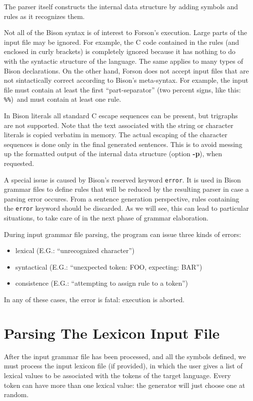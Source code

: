 \documentclass[a4paper,12pt]{article}
\begin{document}
The parser itself constructs the internal data structure by adding symbols and rules as it recognizes them.

Not all of the Bison syntax is of interest to Forson's execution. Large parts of the input file may be ignored. For example, the C code contained in the rules (and enclosed in curly brackets) is completely ignored because it has nothing to do with the syntactic structure of the language. The same applies to many types of Bison declarations. On the other hand, Forson does not accept input files that are not sintactically correct according to Bison's meta-syntax. For example, the input file must contain at least the first ``part-separator'' (two percent signs, like this: \verb/%%/)\ and must contain at least one rule.

In Bison literals all standard C escape sequences can be present, but trigraphs are not supported. Note that the text associated with the string or character literals is copied verbatim in memory. The actual escaping of the character sequences is done only in the final generated sentences. This is to avoid messing up the formatted output of the internal data structure (option \textbf{-p}), when requested.

A special issue is caused by Bison's reserved keyword \verb/error/. It is used in Bison grammar files to define rules that will be reduced by the resulting parser in case a parsing error occures. From a sentence generation perspective, rules containing the \verb/error/ keyword should be discarded. As we will see, this can lead to particular situations, to take care of in the next phase of grammar elaboration.

During input grammar file parsing, the program can issue three kinds of errors:
\begin{itemize}
\item
lexical (E.G.: ``unrecognized character'')
\item
syntactical (E.G.: ``unexpected token: FOO, expecting: BAR'')
\item
consistence (E.G.: ``attempting to assign rule to a token'')
\end{itemize}

\noindent
In any of these cases, the error is fatal: execution is aborted.



\section{Parsing The Lexicon Input File}
After the input grammar file has been processed, and all the symbols defined, we must process the input lexicon file (if provided), in which the user gives a list of lexical values to be associated with the tokens of the target language. Every token can have more than one lexical value: the generator will just choose one at random.
\end{document}
